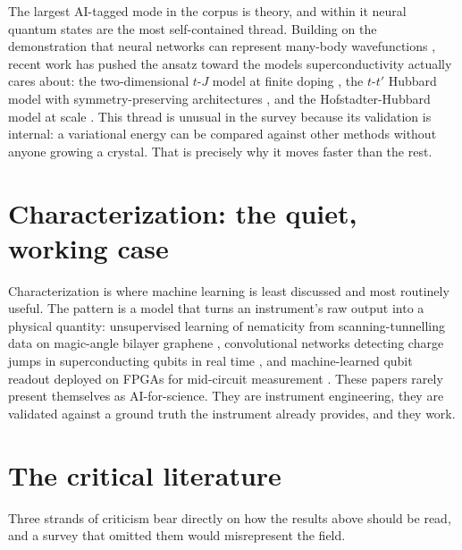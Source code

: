 \documentclass[
  11pt,
]{article}
\begin{document}
The largest AI-tagged mode in the corpus is theory, and within it neural
quantum states are the most self-contained thread. Building on the
demonstration that neural networks can represent many-body wavefunctions
\citep{carleo2017solving}, recent work has pushed the ansatz toward the
models superconductivity actually cares about: the two-dimensional
\(t\)-\(J\) model at finite doping \citep{lange2024simulating}, the
\(t\)-\(t'\) Hubbard model with symmetry-preserving architectures
\citep{rende2026superconductivity}, and the Hofstadter-Hubbard model at
scale \citep{roth2026large}. This thread is unusual in the survey
because its validation is internal: a variational energy can be compared
against other methods without anyone growing a crystal. That is
precisely why it moves faster than the rest.

\section{Characterization: the quiet, working
case}\label{characterization-the-quiet-working-case}

Characterization is where machine learning is least discussed and most
routinely useful. The pattern is a model that turns an instrument's raw
output into a physical quantity: unsupervised learning of nematicity
from scanning-tunnelling data on magic-angle bilayer graphene
\citep{taranto2022unsupervised}, convolutional networks detecting charge
jumps in superconducting qubits in real time
\citep{gaytanvillarreal2026real}, and machine-learned qubit readout
deployed on FPGAs for mid-circuit measurement
\citep{vora2024ml, otting2026multi}. These papers rarely present
themselves as AI-for-science. They are instrument engineering, they are
validated against a ground truth the instrument already provides, and
they work.

\section{The critical literature}\label{the-critical-literature}

Three strands of criticism bear directly on how the results above should
be read, and a survey that omitted them would misrepresent the field.
\end{document}
